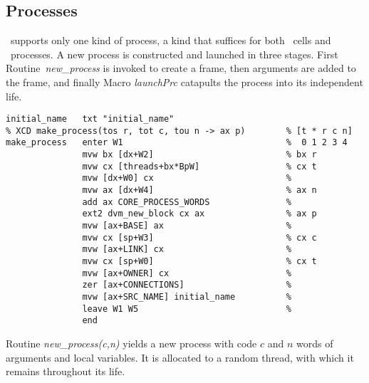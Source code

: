 \subsection{Processes}\label{abstractprocesses}


\dvmasm\ supports only one kind of process, a kind that suffices for both \desi\ cells and \desi\ processes. A new process is constructed and launched in three stages. First Routine~\emph{new\_process} is invoked to create a frame, then arguments are added to the frame, and finally Macro \emph{launchPrc} catapults the process into its independent life.

\begin{tabbing}
\indents
{}
\fin
\end{tabbing}

{\small
\begin{verbatim}
initial_name   txt "initial_name"
% XCD make_process(tos r, tot c, tou n -> ax p)        % [t * r c n]
make_process   enter W1                                %  0 1 2 3 4
               mvw bx [dx+W2]                          % bx r
               mvw cx [threads+bx*BpW]                 % cx t
               mvw [dx+W0] cx                          %
               mvw ax [dx+W4]                          % ax n
               add ax CORE_PROCESS_WORDS               %
               ext2 dvm_new_block cx ax                % ax p
               mvw [ax+BASE] ax                        %
               mvw cx [sp+W3]                          % cx c
               mvw [ax+LINK] cx                        %
               mvw cx [sp+W0]                          % cx t
               mvw [ax+OWNER] cx                       %
               zer [ax+CONNECTIONS]                    %
               mvw [ax+SRC_NAME] initial_name          %
               leave W1 W5                             %
               end
\end{verbatim}}

Routine \emph{new\_process(c,n)} yields a new process with code $c$ and $n$ words of arguments and local variables. It is allocated to a random thread, with which it remains throughout its life.

